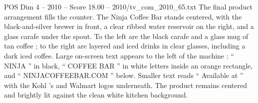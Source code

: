 \begin{textsample}{POS Dim 4 – 2010 – Score 18.00 – 2010/tv\_com\_2010\_65.txt}
The final product arrangement fills the counter.
The Ninja Coffee Bar stands centered, with the black-and-silver brewer in front, a clear ribbed water reservoir on the right, and a glass carafe under the spout.
To the left are the black carafe and a glass mug of tan coffee ; to the right are layered and iced drinks in clear glasses, including a dark iced coffee.
Large on-screen text appears to the left of the machine : “ NINJA ” in black, “ COFFEE BAR ” in white letters inside an orange rectangle, and “ NINJACOFFEEBAR.COM ” below.
Smaller text reads “ Available at ” with the Kohl ’s and Walmart logos underneath.
The product remains centered and brightly lit against the clean white kitchen background.

\end{textsample}
